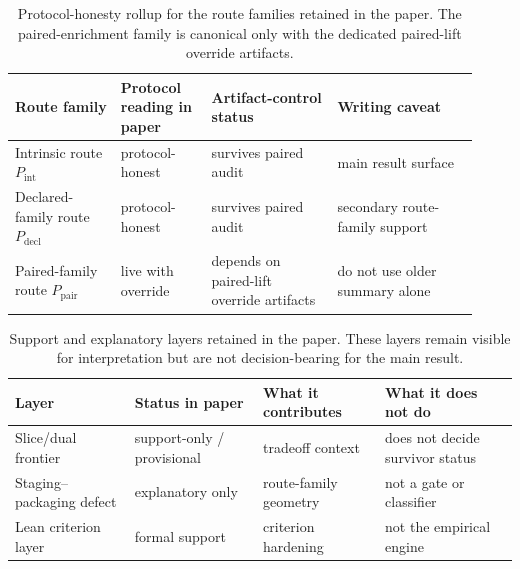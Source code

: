 \documentclass[11pt]{article}
\theoremstyle{definition}
\begin{document}
\begin{table}[H]
\centering
\caption{Protocol-honesty rollup for the route families retained in the paper. The paired-enrichment family is canonical only with the dedicated paired-lift override artifacts.}
\label{tab:exact-protocol-rollup}
\small
\begin{tabular}{@{}>{\raggedright\arraybackslash}p{0.21\linewidth}>{\raggedright\arraybackslash}p{0.18\linewidth}>{\raggedright\arraybackslash}p{0.25\linewidth}>{\raggedright\arraybackslash}p{0.28\linewidth}@{}}
\hline
Route family & Protocol reading in paper & Artifact-control status & Writing caveat \\
\hline
Intrinsic route $P_{\mathrm{int}}$ & protocol-honest & survives paired audit & main result surface \\
Declared-family route $P_{\mathrm{decl}}$ & protocol-honest & survives paired audit & secondary route-family support \\
Paired-family route $P_{\mathrm{pair}}$ & live with override & depends on paired-lift override artifacts & do not use older summary alone \\
\hline
\end{tabular}
\end{table}
 
\begin{table}[H]
\centering
\caption{Support and explanatory layers retained in the paper. These layers remain visible for interpretation but are not decision-bearing for the main result.}
\label{tab:exact-support-layers}
\begin{tabularx}{\linewidth}{@{}l l >{\raggedright\arraybackslash}X >{\raggedright\arraybackslash}X@{}}
\hline
Layer & Status in paper & What it contributes & What it does not do \\
\hline
Slice/dual frontier & support-only / provisional & tradeoff context & does not decide survivor status \\
Staging--packaging defect & explanatory only & route-family geometry & not a gate or classifier \\
Lean criterion layer & formal support & criterion hardening & not the empirical engine \\
\hline
\end{tabularx}
\end{table}
  


\end{document}
